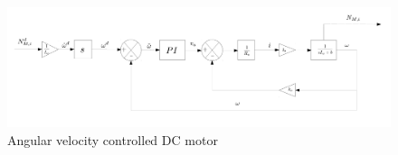 %
\begin{figure}[H]
	\centering
	\includegraphics[width=1\linewidth]{figures/omegaControl}
	\caption{Angular velocity controlled DC motor}
	\label{fig:blockdi}
\end{figure}
%

% 

%

%
